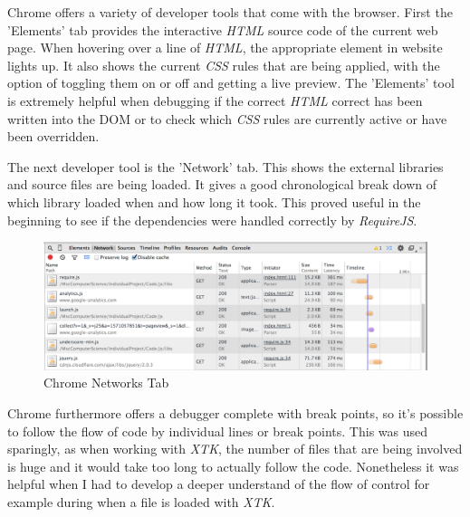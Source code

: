 \documentclass[a4paper,11pt,twoside]{article}
\begin{document}
Chrome offers a variety of developer tools that come with the browser. First the 'Elements' tab provides the interactive \textit{HTML} source code of the current web page. When hovering over a line of \textit{HTML}, the appropriate element in website lights up. It also shows the current \textit{CSS} rules that are being applied, with the option of toggling them on or off and getting a live preview. The 'Elements' tool is extremely helpful when debugging if the correct \textit{HTML} correct has been written into the DOM or to check which \textit{CSS} rules are currently active or have been overridden.


The next developer tool is the 'Network' tab. This shows the external libraries and source files are being loaded. It gives a good chronological break down of which library loaded when and how long it took. This proved useful in the beginning to see if the dependencies were handled correctly by \textit{RequireJS}.

\begin{figure}[ht!]
\centering
\includegraphics[width=140mm]{graphics/chromeNetwork_01.png}
\caption{Chrome Networks Tab}
\label{fig:UIdesign1}
\end{figure}


Chrome furthermore offers a debugger complete with break points, so it's possible to follow the flow of code  by individual lines or break points. This was used sparingly, as when working with \textit{XTK}, the number of files that are being involved is huge and it would take too long to actually follow the code. Nonetheless it was helpful when I had to develop a deeper understand of the flow of control for example during when a file is loaded with \textit{XTK}.
\end{document}
